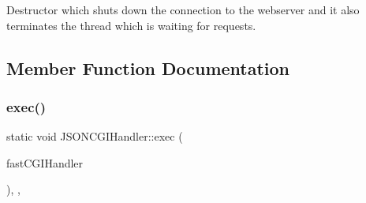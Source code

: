Destructor which shuts down the connection to the webserver and it also terminates the thread which is waiting for requests. 

\subsection{Member Function Documentation}
\mbox{\label{classJSONCGIHandler_a42518cd5ad781476d299b50e4c4c0000}} 
\subsubsection{\texorpdfstring{exec()}{exec()}}
{\footnotesize\ttfamily static void J\+S\+O\+N\+C\+G\+I\+Handler\+::exec (\begin{DoxyParamCaption}\item[{\hyperlink{classJSONCGIHandler}{J\+S\+O\+N\+C\+G\+I\+Handler} $\ast$}]{fast\+C\+G\+I\+Handler }\end{DoxyParamCaption})\hspace{0.3cm}{\ttfamily [inline]}, {\ttfamily [static]}, {\ttfamily [private]}}

